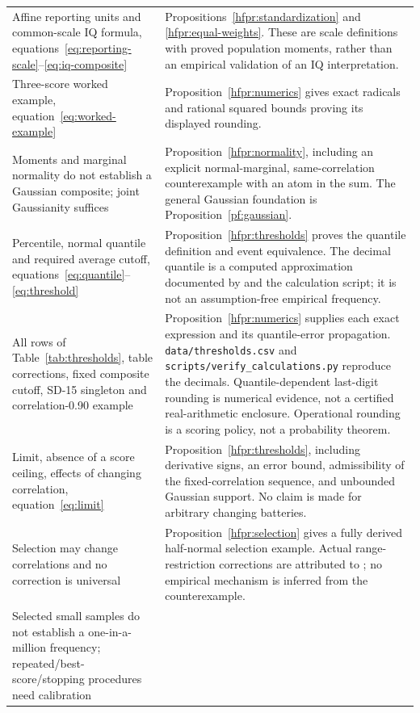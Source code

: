 \begin{longtable}{>{\raggedright\arraybackslash}p{.35\linewidth}>{\raggedright\arraybackslash}p{.59\linewidth}}
Affine reporting units and common-scale IQ formula,
equations~\ref{eq:reporting-scale}--\ref{eq:iq-composite} &
Propositions~\ref{hfpr:standardization} and \ref{hfpr:equal-weights}.
These are scale definitions with proved population moments, rather than
an empirical validation of an IQ interpretation.\\
Three-score worked example, equation~\ref{eq:worked-example} &
Proposition~\ref{hfpr:numerics} gives exact radicals and rational
squared bounds proving its displayed rounding.\\
Moments and marginal normality do not establish a Gaussian composite;
joint Gaussianity suffices &
Proposition~\ref{hfpr:normality}, including an explicit normal-marginal,
same-correlation counterexample with an atom in the sum. The general
Gaussian foundation is Proposition~\ref{pf:gaussian}.\\
Percentile, normal quantile and required average cutoff,
equations~\ref{eq:quantile}--\ref{eq:threshold} &
Proposition~\ref{hfpr:thresholds} proves the quantile definition and
event equivalence. The decimal quantile is a computed approximation
documented by \citet{rnormal} and the calculation script; it is not an
assumption-free empirical frequency.\\
All rows of Table~\ref{tab:thresholds}, table corrections, fixed composite
cutoff, SD-15 singleton and correlation-0.90 example &
Proposition~\ref{hfpr:numerics} supplies each exact expression and its
quantile-error propagation. \texttt{data/thresholds.csv} and
\texttt{scripts/verify\_calculations.py} reproduce the decimals.
Quantile-dependent last-digit rounding is numerical evidence, not a
certified real-arithmetic enclosure. Operational rounding is a scoring
policy, not a probability theorem.\\
Limit, absence of a score ceiling, effects of changing correlation,
equation~\ref{eq:limit} &
Proposition~\ref{hfpr:thresholds}, including derivative signs, an error
bound, admissibility of the fixed-correlation sequence, and unbounded
Gaussian support. No claim is made for arbitrary changing batteries.\\
Selection may change correlations and no correction is universal &
Proposition~\ref{hfpr:selection} gives a fully derived half-normal
selection example. Actual range-restriction corrections are attributed
to \citet{sackett2000}; no empirical mechanism is inferred from the
counterexample.\\
Selected small samples do not establish a one-in-a-million frequency;
repeated/best-score/stopping procedures need calibration &

\end{longtable}
